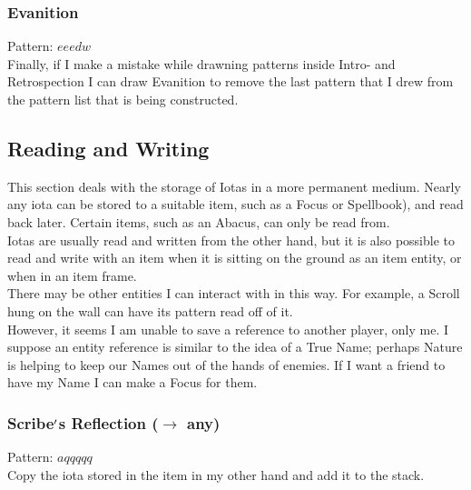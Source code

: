 \documentclass[12pt]{article}
\begin{document}
  \label{sec: patterns/patterns_as_iotas@hexcasting:undo}
\subsubsection*{Evanition}

    Pattern: $eeedw$\\
      Finally, if I make a mistake while drawning patterns inside Intro- and Retrospection I can draw Evanition to remove the last pattern that I drew from the pattern list that is being constructed.\\

\newpage

\label{sec:patterns/readwrite}
\subsection*{Reading and Writing}


  
    This section deals with the storage of Iotas in a more permanent medium. Nearly any iota can be stored to a suitable item, such as a Focus or Spellbook), and read back later. Certain items, such as an Abacus, can only be read from.\\Iotas are usually read and written from the other hand, but it is also possible to read and write with an item when it is sitting on the ground as an item entity, or when in an item frame.\\


  
    There may be other entities I can interact with in this way. For example, a Scroll hung on the wall can have its pattern read off of it.\\However, it seems I am unable to save a reference to another player, only me. I suppose an entity reference is similar to the idea of a True Name; perhaps Nature is helping to keep our Names out of the hands of enemies. If I want a friend to have my Name I can make a Focus for them.\\


  \label{sec: patterns/readwrite@hexcasting:read}
\subsubsection*{Scribe$\rq$s Reflection ($\rightarrow$ any)}

    Pattern: $aqqqqq$\\
      Copy the iota stored in the item in my other hand and add it to the stack.\\
\end{document}
